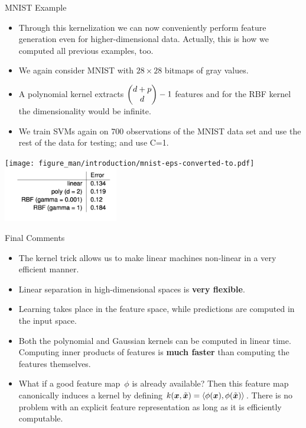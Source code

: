 \begin{vbframe}{MNIST Example}

    \begin{itemize}
      \item Through this kernelization we can now conveniently perform feature generation even
        for higher-dimensional data. Actually, this is how we computed all previous examples, too.
      \item We again consider MNIST with $28 \times 28$ bitmaps of gray values.
      \item A polynomial kernel extracts $\begin{pmatrix} d + p \\ d \end{pmatrix}-1$ features and for the RBF kernel the dimensionality would be infinite.
      \item We train SVMs again on 700 observations of the MNIST data set and use the rest of the data for testing; and use C=1.

    \end{itemize}

\begin{center}
\texttt{[image: figure\_man/introduction/mnist-eps-converted-to.pdf]} ~~~ \includegraphics[width=5cm]{figure_man/error.png}
\end{center}


\end{vbframe}




\begin{vbframe}{Final Comments}

\begin{itemize}
\item The kernel trick allows us to make linear machines non-linear in a very
  efficient manner.
\item Linear separation in high-dimensional spaces is \textbf{very flexible}.

  \item Learning takes place in the feature space, while predictions are computed in the input space.
  \item Both the polynomial and Gaussian kernels can be computed in linear time. Computing inner products of features is \textbf{much faster} than computing the features themselves.
\item What if a good feature map~$\phi$ is already available?
Then this feature map canonically induces a kernel by
defining $k(\bm{x}, \tilde {\bm{x}}) = \left\langle \phi(\bm{x}), \phi(\tilde {\bm{x}}) \right\rangle$.
There is no problem with an explicit feature representation
as long as it is efficiently computable.
\end{itemize}
\end{vbframe}


\endlecture

